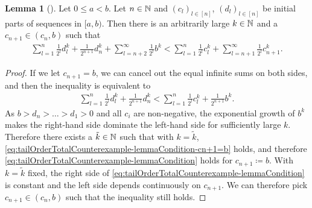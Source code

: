 \documentclass[a4paper]{scrreprt}
\theoremstyle{definition}
\newtheorem{lemma}[thm]{Lemma} %
\begin{document}
    \begin{lemma}[{\cite{bib:epperleinTailOrderTotalCounterexample}}]
        \label{lem:tailOrderTotalCounterexample-lemmaCondition}
        Let $0 \leq a < b$. Let $n \in \mathbb{N}$ and $(c_l)_{l \in [n]}$, $(d_l)_{l \in [n]}$ be initial parts of sequences in $[a, b)$.
        Then there is an arbitrarily large $k \in \mathbb{N}$ and a $c_{n+1} \in (c_n, b)$ such that
        \begin{gather}
            \sum_{l=1}^{n} \frac{1}{2^l} d_l^k + \frac{1}{2^{n+1}} d_n^k + \sum_{l = n+2}^{\infty} \frac{1}{2^l} b^k
            < \sum_{l=1}^{n} \frac{1}{2^l} c_l^k + \sum_{l = n+1}^{\infty} \frac{1}{2^l} c_{n+1}^k.
            \label{eq:tailOrderTotalCounterexample-lemmaCondition}
        \end{gather}
    \end{lemma}
    \begin{proof}
        If we let $c_{n+1} = b$, we can cancel out the equal infinite sums on both sides, and then the inequality is equivalent to
        \begin{gather}
            \sum_{l=1}^{n} \frac{1}{2^l} d_l^k + \frac{1}{2^{n+1}} d_n^k
            < \sum_{l=1}^{n} \frac{1}{2^l} c_l^k + \frac{1}{2^{n+1}} b^k.
            \label{eq:tailOrderTotalCounterexample-lemmaCondition-cn+1=b}
        \end{gather}
        As $b > d_n > \dots > d_1 > 0$ and all $c_i$ are non-negative, the exponential growth of $b^k$ makes the right-hand side dominate the left-hand side for sufficiently large $k$.
        Therefore there exists a $\tilde{k} \in \mathbb{N}$ such that with $k = \tilde{k}$, \eqref{eq:tailOrderTotalCounterexample-lemmaCondition-cn+1=b} holds, and therefore \eqref{eq:tailOrderTotalCounterexample-lemmaCondition} holds for $c_{n+1} \coloneqq b$.
        With $k = \tilde{k}$ fixed, the right side of \eqref{eq:tailOrderTotalCounterexample-lemmaCondition} is constant and the left side depends continuously on $c_{n+1}$. We can therefore pick $c_{n+1} \in (c_n, b)$ such that the inequality still holds.
    \end{proof}
    
\end{document}
